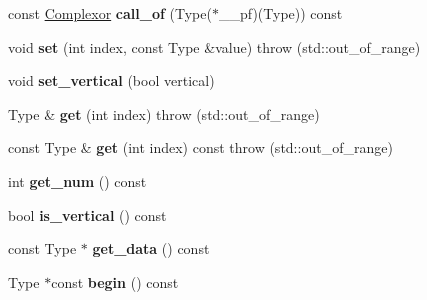 \begin{DoxyCompactItemize}
\item 
\mbox{\label{classkerbal_1_1math_1_1_complexor_ad7a6e630e8760fc7c63254b87a11a061}} 
const \hyperlink{classkerbal_1_1math_1_1_complexor}{Complexor} {\bfseries call\+\_\+of} (Type($\ast$\+\_\+\+\_\+pf)(Type)) const
\item 
\mbox{\label{classkerbal_1_1math_1_1_complexor_a20bcbee0fea29f090f7d030dc4797807}} 
void {\bfseries set} (int index, const Type \&value)  throw (std\+::out\+\_\+of\+\_\+range)
\item 
\mbox{\label{classkerbal_1_1math_1_1_complexor_a2a079fc33e5223e7d05a547dfd48c180}} 
void {\bfseries set\+\_\+vertical} (bool vertical)
\item 
\mbox{\label{classkerbal_1_1math_1_1_complexor_a7525c908d615a1c53604102af313d59e}} 
Type \& {\bfseries get} (int index)  throw (std\+::out\+\_\+of\+\_\+range)
\item 
\mbox{\label{classkerbal_1_1math_1_1_complexor_ab9fc50d27645d8b07401f758d846a333}} 
const Type \& {\bfseries get} (int index) const  throw (std\+::out\+\_\+of\+\_\+range)
\item 
\mbox{\label{classkerbal_1_1math_1_1_complexor_a65ed115489c9cbf92987a46aa793d886}} 
int {\bfseries get\+\_\+num} () const
\item 
\mbox{\label{classkerbal_1_1math_1_1_complexor_a5b817abc94c555f5f3c43bf0a8e72518}} 
bool {\bfseries is\+\_\+vertical} () const
\item 
\mbox{\label{classkerbal_1_1math_1_1_complexor_ac74337bea9e8db1c330e2fb0b58a9ebf}} 
const Type $\ast$ {\bfseries get\+\_\+data} () const
\item 
\mbox{\label{classkerbal_1_1math_1_1_complexor_af4ce85870ca4db60a80feb4618c1f88e}} 
Type $\ast$const {\bfseries begin} () const
\item 
\mbox{\label{classkerbal_1_1math_1_1_complexor_a0b208809c5c749e22de7b236df226154}} 

\end{DoxyCompactItemize}
